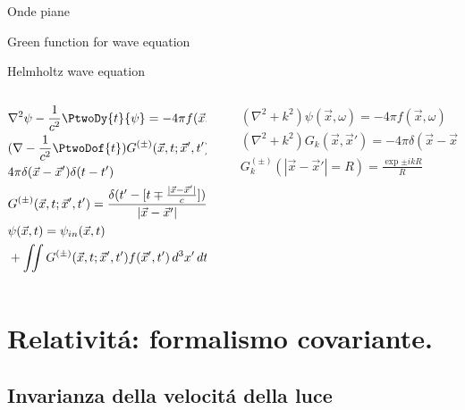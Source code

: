 \begin{frame}{Onde piane}
    
\end{frame}

\begin{frame}{Green function for wave equation}
    \begin{block}{Helmholtz wave equation}
    \begin{columns}[T]
    \begin{column}{0.5\textwidth}
    \begin{align*}
    &\nabla^2\psi-\frac{1}{c^2}\PtwoDy{t}{\psi}=-4\pi f(\vec{x},t)\\
    &(\nabla-\frac{1}{c^2}\PtwoDof{t})G^{(\pm)}(\vec{x},t;\vec{x}',t')=\\
    &4\pi\delta(\vec{x}-\vec{x}')\delta(t-t')\\
    &G^{(\pm)}(\vec{x},t;\vec{x}',t')=\frac{\delta(t'-[t\mp\frac{|\vec{x}-\vec{x}'|}{c}])}{|\vec{x}-\vec{x}'|}\\
    &\psi(\vec{x},t)=\psi_{in}(\vec{x},t)\\
    &+\iint G^{(\pm)}(\vec{x},t;\vec{x}',t')f(\vec{x}',t')\,d^3x'\,dt'
    \end{align*}    
    \end{column}
    \begin{column}{0.5\textwidth}
    \begin{align*}
    &(\nabla^2+k^2)\psi(\vec{x},\omega)=-4\pi f(\vec{x},\omega)\\
    &(\nabla^2+k^2)G_k(\vec{x},\vec{x}')=-4\pi\delta(\vec{x}-\vec{x}')\\
    &G_k^{(\pm)}(|\vec{x}-\vec{x}'|=R)=\frac{\exp{\pm ikR}}{R}
    \end{align*}    
    \end{column}

    \end{columns}
    \end{block}
\end{frame}

\section{Relativit\'a: formalismo covariante.}

\subsection{Invarianza della velocit\'a della luce}

